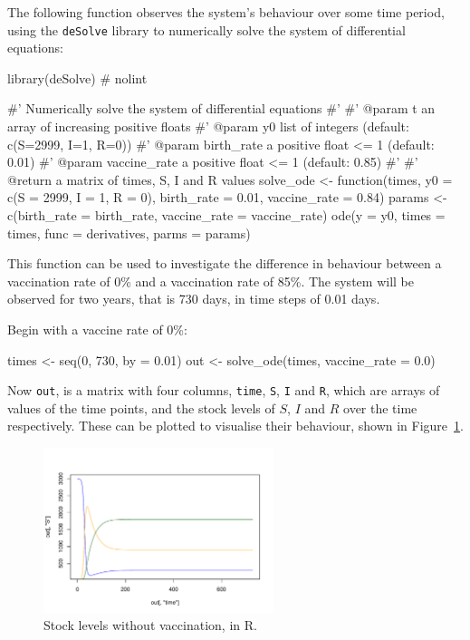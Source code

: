 The following function observes the system's behaviour over some time period,
using the \texttt{deSolve} library to numerically solve the system of
differential equations:

\begin{Rin}
library(deSolve)  # nolint

#' Numerically solve the system of differential equations
#'
#' @param t an array of increasing positive floats
#' @param y0 list of integers (default: c(S=2999, I=1, R=0))
#' @param birth_rate a positive float <= 1 (default: 0.01)
#' @param vaccine_rate a positive float <= 1 (default: 0.85)
#'
#' @return a matrix of times, S, I and R values
solve_ode <- function(times,
                          y0 = c(S = 2999, I = 1, R = 0),
                          birth_rate = 0.01,
                          vaccine_rate = 0.84){
  params <- c(birth_rate = birth_rate,
                  vaccine_rate = vaccine_rate)
  ode(y = y0,
      times = times,
      func = derivatives,
      parms = params)
}
\end{Rin}

This function can be used to investigate the difference in behaviour between
a vaccination rate of 0\% and a vaccination rate of 85\%. The system will be
observed for two years, that is 730 days, in time steps of 0.01 days.

Begin with a vaccine rate of 0\%:

\begin{Rin}
times <- seq(0, 730, by = 0.01)
out <- solve_ode(times, vaccine_rate = 0.0)
\end{Rin}

Now \texttt{out}, is a matrix with four columns,  \texttt{time},
\texttt{S}, \texttt{I} and \texttt{R}, which are arrays of
values of the time points, and the stock levels of $S$, $I$ and $R$ over the
time respectively.
These can be plotted to visualise their behaviour, shown in
Figure~\ref{fig:plot_no_vaccine_R}.

\begin{figure}
\begin{center}
\includegraphics[width=0.6\textwidth]{./assets/sd_vaccine_plots/plot_no_vaccine_R.pdf}
\end{center}
\caption{Stock levels without vaccination, in R.}
\label{fig:plot_no_vaccine_R}
\end{figure}

